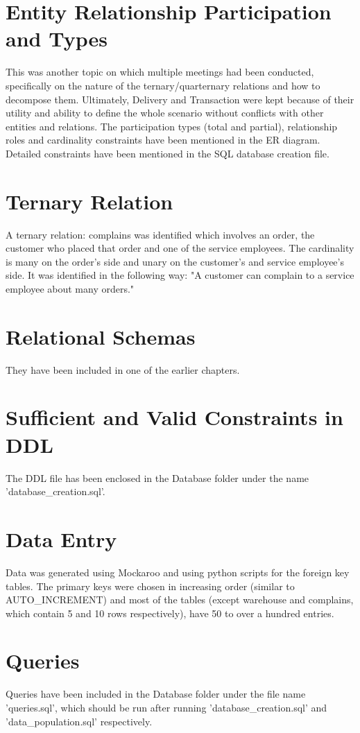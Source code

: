 \documentclass[12pt]{report}
\begin{document}
	\section{Entity Relationship Participation and Types}
	This was another topic on which multiple meetings had been conducted, specifically on the nature of the ternary/quarternary relations and how to decompose them. Ultimately, Delivery and Transaction were kept because of their utility and ability to define the whole scenario without conflicts with other entities and relations. The participation types (total and partial), relationship roles and cardinality constraints have been mentioned in the ER diagram. Detailed constraints have been mentioned in the SQL database creation file.

	\section{Ternary Relation}
	A ternary relation: complains was identified which involves an order, the customer who placed that order and one of the service employees. The cardinality is many on the order's side and unary on the customer's and service employee's side. It was identified in the following way: "A customer can complain to a service employee about many orders."

	\section{Relational Schemas}
	They have been included in one of the earlier chapters.
	
	\section{Sufficient and Valid Constraints in DDL}
	The DDL file has been enclosed in the Database folder under the name 'database\_creation.sql'.

	\section{Data Entry}
	Data was generated using Mockaroo and using python scripts for the foreign key tables. The primary keys were chosen in increasing order (similar to AUTO\_INCREMENT) and most of the tables (except warehouse and complains, which contain 5 and 10 rows respectively), have 50 to over a hundred entries.

	\section{Queries}
	Queries have been included in the Database folder under the file name 'queries.sql', which should be run after running 'database\_creation.sql' and 'data\_population.sql' respectively.
	
\end{document}
